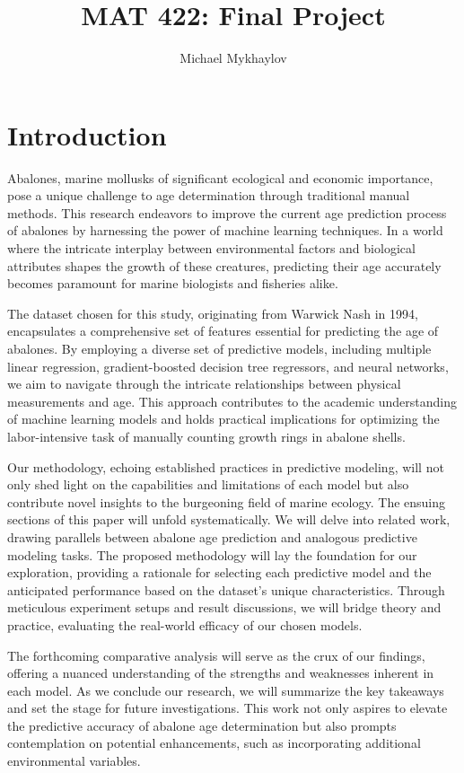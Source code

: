 \documentclass[12pt]{article}
\title{MAT 422: Final Project}
\author{Michael Mykhaylov}
\begin{document}
\maketitle

\section{Introduction}

Abalones, marine mollusks of significant ecological and economic importance, pose a unique challenge to age determination through traditional manual methods. This research endeavors to improve the current age prediction process of abalones by harnessing the power of machine learning techniques. In a world where the intricate interplay between environmental factors and biological attributes shapes the growth of these creatures, predicting their age accurately becomes paramount for marine biologists and fisheries alike.

The dataset chosen for this study, originating from Warwick Nash in 1994, encapsulates a comprehensive set of features essential for predicting the age of abalones. By employing a diverse set of predictive models, including multiple linear regression, gradient-boosted decision tree regressors, and neural networks, we aim to navigate through the intricate relationships between physical measurements and age. This approach contributes to the academic understanding of machine learning models and holds practical implications for optimizing the labor-intensive task of manually counting growth rings in abalone shells.

Our methodology, echoing established practices in predictive modeling, will not only shed light on the capabilities and limitations of each model but also contribute novel insights to the burgeoning field of marine ecology. The ensuing sections of this paper will unfold systematically. We will delve into related work, drawing parallels between abalone age prediction and analogous predictive modeling tasks. The proposed methodology will lay the foundation for our exploration, providing a rationale for selecting each predictive model and the anticipated performance based on the dataset's unique characteristics. Through meticulous experiment setups and result discussions, we will bridge theory and practice, evaluating the real-world efficacy of our chosen models.

The forthcoming comparative analysis will serve as the crux of our findings, offering a nuanced understanding of the strengths and weaknesses inherent in each model. As we conclude our research, we will summarize the key takeaways and set the stage for future investigations. This work not only aspires to elevate the predictive accuracy of abalone age determination but also prompts contemplation on potential enhancements, such as incorporating additional environmental variables.
\end{document}
